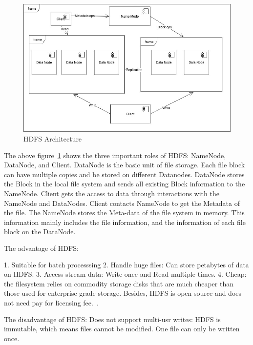 \begin{figure}[!ht]
  \centering\includegraphics[width=\columnwidth]{images/HDFS.jpg}
  \caption{HDFS Architecture}\label{f:hdfs}
\end{figure}


The above figure~\ref{f:hdfs} shows the three important roles of HDFS: NameNode, 
DataNode, and Client. DataNode is the basic unit of file storage. Each file block 
can have multiple copies and be stored on different Datanodes. DataNode stores the 
Block in the local file system and sends all existing Block information to the 
NameNode. Client gets the access to data through interactions with the NameNode and 
DataNodes. Client contacts NameNode to get the Metadata of the file. The NameNode 
stores the Meta-data of the file system in memory. This information mainly includes 
the file information, and the information of each file block on the DataNode. 

The advantage of HDFS:

1. Suitable for batch processsing
2. Handle huge files: Can store petabytes of data on HDFS.
3. Access stream data: Write once and Read multiple times.
4. Cheap: the filesystem relies on commodity storage disks that are much cheaper 
than those used for enterprise grade storage. Besides, HDFS is open source and does 
not need pay for licensing fee.~\cite{hid-sp18-508-hdfs}.

The disadvantage of HDFS:
 Does not support multi-usr writes: HDFS is immutable, which means files cannot 
 be modified. One file can only be written once. 


